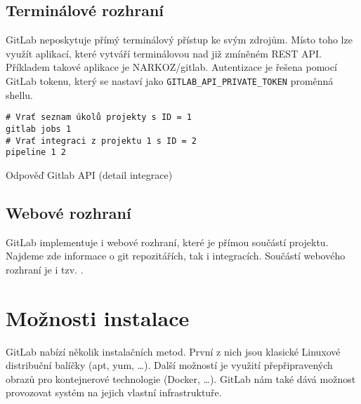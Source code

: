 \subsection{Terminálové rozhraní}

GitLab neposkytuje přímý terminálový přístup ke svým zdrojům.
Místo toho lze využít aplikací, které vytváří terminálovou  nad již zmíněném REST API.
Příkladem takové aplikace je NARKOZ/gitlab.
Autentizace je řešena pomocí GitLab tokenu, který se nastaví jako \verb|GITLAB_API_PRIVATE_TOKEN| proměnná shellu.

\begin{listing}[ht]
\begin{verbatim}
# Vrať seznam úkolů projekty s ID = 1
gitlab jobs 1
# Vrať integraci z projektu 1 s ID = 2
pipeline 1 2
\end{verbatim}
\label{code:gitlab-api}
\caption{Odpověď Gitlab API (detail integrace)}
\end{listing}

\subsection{Webové rozhraní}

GitLab implementuje i webové rozhraní, které je přímou součástí projektu.
Najdeme zde informace o git repozitářích, tak i integracích.
Součástí webového rozhraní je i tzv. .


\section{Možnosti instalace}

GitLab nabízí několik instalačních metod.
První z nich jsou klasické Linuxové distribuční balíčky (apt, yum, \ldots).
Další možností je využití přepřipravených obrazů pro kontejnerové technologie (Docker, \ldots).
GitLab nám také dává možnost provozovat systém na jejich vlastní infrastruktuře.

